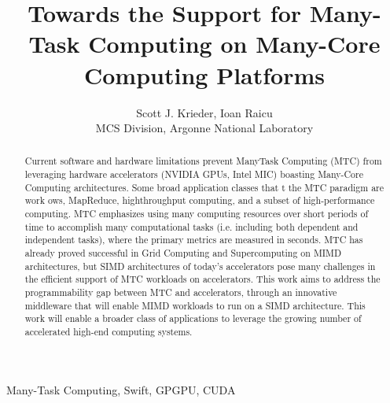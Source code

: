 \documentclass[conference]{IEEEtran}
\begin{document}
%
\title{Towards the Support for Many-Task Computing on Many-Core Computing Platforms}


\author{Scott J. Krieder,
Ioan Raicu\\
MCS Division, Argonne National Laboratory
}


\maketitle


\begin{abstract}
Current software and hardware limitations prevent ManyTask Computing (MTC) from leveraging hardware accelerators (NVIDIA GPUs, Intel MIC) boasting Many-Core Computing architectures. Some broad application classes that t the MTC paradigm are work ows, MapReduce, highthroughput computing, and a subset of high-performance computing. MTC emphasizes using many computing resources over short periods of time to accomplish many computational tasks (i.e. including both dependent and independent tasks), where the primary metrics are measured in seconds. MTC has already proved successful in Grid Computing and Supercomputing on MIMD architectures, but SIMD architectures of today's accelerators pose many challenges in the efficient support of MTC workloads on accelerators. This work aims to address the programmability gap between MTC and accelerators, through an innovative middleware that will enable MIMD workloads to run on a SIMD architecture. This work will enable a broader class of applications to leverage the growing number of accelerated high-end computing systems.
\end{abstract}

\begin{IEEEkeywords}
Many-Task Computing, Swift, GPGPU, CUDA
\end{IEEEkeywords}

\IEEEpeerreviewmaketitle
\end{document}
